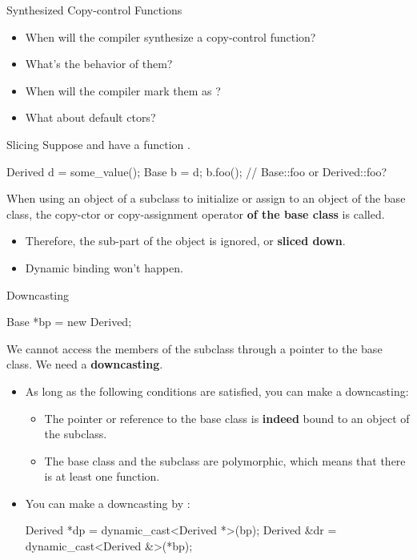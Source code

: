 \documentclass{beamer}
\begin{document}
\begin{frame}{Synthesized Copy-control Functions}
    \begin{itemize}
        \item When will the compiler synthesize a copy-control function?
        \item What's the behavior of them?
        \item When will the compiler mark them as ?
        \item What about default ctors?
    \end{itemize}
\end{frame}

\begin{frame}[fragile]{Slicing}
    Suppose  and  have a \virtual function .
    \begin{cpp}
Derived d = some_value();
Base b = d;
b.foo();    // Base::foo or Derived::foo?
    \end{cpp}
    When using an object of a subclass to initialize or assign to an object of the base class, the copy-ctor or copy-assignment operator \textbf{of the base class} is called.
    \begin{itemize}
        \item Therefore, the sub-part of the object is ignored, or \textbf{sliced down}.
        \item Dynamic binding won't happen.
    \end{itemize}
\end{frame}

\begin{frame}[fragile]{Downcasting}
    \begin{cpp}
Base *bp = new Derived{};
    \end{cpp}
    We cannot access the members of the subclass through a pointer to the base class. We need a \textbf{downcasting}.
    \begin{itemize}
        \item As long as the following conditions are satisfied, you can make a downcasting:
        \begin{itemize}
            \item The pointer or reference to the base class is \textbf{indeed} bound to an object of the subclass.
            \item The base class and the subclass are polymorphic, which means that there is at least one \virtual function.
        \end{itemize}
        \item You can make a downcasting by :
        \begin{cpp}
Derived *dp = dynamic_cast<Derived *>(bp);
Derived &dr = dynamic_cast<Derived &>(*bp);
        \end{cpp}
    \end{itemize}
\end{frame}
\end{document}
